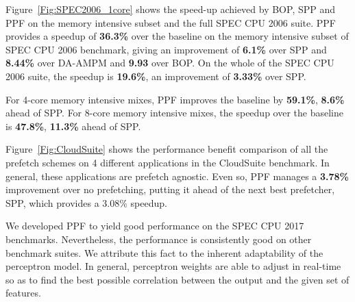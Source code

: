 %
%

Figure~\ref{Fig:SPEC2006_1core} shows the speed-up achieved by BOP, SPP and
PPF on the memory intensive subset and the full SPEC CPU 2006 suite. 
PPF provides a speedup of \textbf{36.3\%} over the baseline on the 
memory intensive subset of SPEC CPU
2006 benchmark, giving an improvement of \textbf{6.1\%} over SPP and
\textbf{8.44\%} over DA-AMPM and \textbf{9.93} over BOP. On the whole of 
the SPEC CPU 2006 suite, the speedup is \textbf{19.6\%}, an improvement 
of \textbf{3.33\%} over SPP.

For 4-core memory intensive mixes, PPF improves the baseline by
\textbf{59.1\%}, \textbf{8.6\%} ahead of SPP. For 8-core memory intensive
mixes, the speedup over the baseline is \textbf{47.8\%}, \textbf{11.3\%} ahead
of SPP.

Figure~\ref{Fig:CloudSuite} shows the performance benefit comparison of all
the prefetch schemes on 4 different applications in the CloudSuite benchmark.
In general, these applications are prefetch agnostic. Even so, PPF manages a
\textbf{3.78\%} improvement over no prefetching, putting it ahead of the next
best prefetcher, SPP, which provides a 3.08\% speedup.

We developed PPF to yield good performance on the SPEC CPU 2017 benchmarks.
Nevertheless, the performance is consistently good on other benchmark suites.
We attribute this fact to the inherent adaptability of the perceptron model.
In general, perceptron weights are able to adjust in real-time so as to find
the best possible correlation between the output and the given set of
features.
